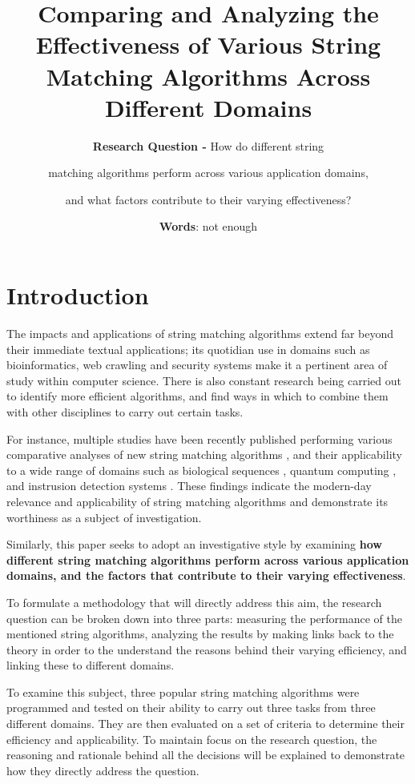 \documentclass[12pt]{article}
\title{\textbf{Comparing and Analyzing the Effectiveness of Various String Matching Algorithms Across Different Domains}} %
\author{\textbf{Research Question -} How do different string \and matching algorithms perform across various application domains, \and and what factors contribute to their varying effectiveness?} %
\date{\textbf{Words}: not enough} %
\begin{document}
\doublespacing

\maketitle %
\thispagestyle{empty}
\pagebreak
\tableofcontents
\thispagestyle{empty}

\clearpage
{}

\pagebreak
\section{Introduction} %

The impacts and applications of string matching algorithms extend far beyond their immediate textual applications; its quotidian use in domains such as bioinformatics, web crawling and security systems make it a pertinent area of study within computer science. There is also constant research being carried out to identify more efficient algorithms, and find ways in which to combine them with other disciplines to carry out certain tasks.

For instance, multiple studies have been recently published performing various comparative analyses of new string matching algorithms \parencite{4}, and their applicability to a wide range of domains such as biological sequences \parencite{5}, quantum computing \parencite{6}, and instrusion detection systems \parencite{7}. These findings indicate the modern-day relevance and applicability of string matching algorithms and demonstrate its worthiness as a subject of investigation.

Similarly, this paper seeks to adopt an investigative style by examining \textbf{how different string matching algorithms perform across various application domains, and the factors that contribute to their varying effectiveness}. 

To formulate a methodology that will directly address this aim, the research question can be broken down into three parts: measuring the performance of the mentioned string algorithms, analyzing the results by making links back to the theory in order to the understand the reasons behind their varying efficiency, and linking these to different domains.

To examine this subject, three popular string matching algorithms were programmed and tested on their ability to carry out three tasks from three different domains. They are then evaluated on a set of criteria to determine their efficiency and applicability. To maintain focus on the research question, the reasoning and rationale behind all the decisions will be explained to demonstrate how they directly address the question.
\end{document}

